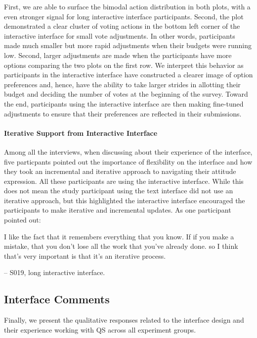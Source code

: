 First, we are able to surface the bimodal action distribution in both plots, with a even stronger signal for long interactive interface participants. Second, the plot demonstrated a clear cluster of voting actions in the bottom left corner of the interactive interface for small vote adjustments. In other words, participants made much smaller but more rapid adjustments when their budgets were running low. Second, larger adjustments are made when the participants have more options comparing the two plots on the first row. We interpret this behavior as participants in the interactive interface have constructed a clearer image of option preferences and, hence, have the ability to take larger strides in allotting their budget and deciding the number of votes at the beginning of the survey. Toward the end, participants using the interactive interface are then making fine-tuned adjustments to ensure that their preferences are reflected in their submissions.

\paragraph{Iterative Support from Interactive Interface}
Among all the interviews, when discussing about their experience of the interface, five particpants pointed out the importance of flexibility on the interface and how they took an incremental and iterative approach to navigating their attitude expression. All these participants are using the interactive interface. While this does not mean the study participant using the text interface did not use an iterative approach, but this highlighted the interactive interface encouraged the participants to make iterative and incremental updates. As one participant pointed out:

\begin{displayquote}
I like the fact that it remembers everything that you know. If if you make a mistake, that you don't lose all the work that you've already done. so I think that's very important is that it's an iterative process.

\noindent \hfill -- S019, long interactive interface.
\end{displayquote}

\subsection{Interface Comments}
Finally, we present the qualitative responses related to the interface design and their experience working with QS across all experiment groups.

